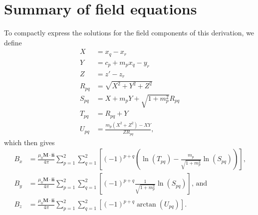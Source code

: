 \section{Summary of field equations}
To compactly express the solutions for the field components of this derivation, we define
\begin{align}
    X &= x_q-x_r \nonumber \\
    Y &= c_p + m_px_q - y_r \nonumber \\
    Z &= z'-z_r \nonumber \\
    R_{pq} &= \sqrt{X^2+Y^2+Z^2} \nonumber \\
    S_{pq} &= X+m_pY+\sqrt{1+m_p^2}R_{pq} \nonumber \\
    T_{pq} &= R_{pq}+Y \nonumber \\
    U_{pq} &= \frac{m_p\left(X^2+Z^2\right)-XY}{ZR_{pq}} \nonumber \text{,}
\end{align}
which then gives
\begin{align}
    B_x &= \frac{\mu_0\mathbf{M}\cdot\hat{\mathbf{n}}}{4\pi} \sum_{p=1}^2 \sum_{q=1}^2 \left[ \left(-1\right)^{p+q} \left( \ln \left(T_{pq} \right) - \frac{m_p}{\sqrt{1+m_p^2}} \ln \left( S_{pq} \right) \right) \right] \text{,} \\
    B_y &= \frac{\mu_0\mathbf{M}\cdot\hat{\mathbf{n}}}{4\pi} \sum_{p=1}^2 \sum_{q=1}^2 \left[ \left(-1\right)^{p+q} \frac{1}{\sqrt{1+m_p^2}} \ln \left(S_{pq} \right) \right] \text{, and} \\
    B_z &= \frac{\mu_0\mathbf{M}\cdot\hat{\mathbf{n}}}{4\pi} \sum_{p=1}^2 \sum_{q=1}^2 \left[ \left(-1\right)^{p+q} \arctan \left(U_{pq}\right) \right] \text{.}
\end{align}
